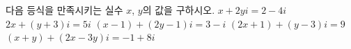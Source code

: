 다음 등식을 만족시키는 실수 $x$, $y$의 값을 구하시오.
 $x+2yi=2-4i$
 $2x+(y+3)i=5i$
 $(x-1)+(2y-1)i=3-i$
 $(2x+1)+(y-3)i=9$
 $(x+y)+(2x-3y)i=-1+8i$
